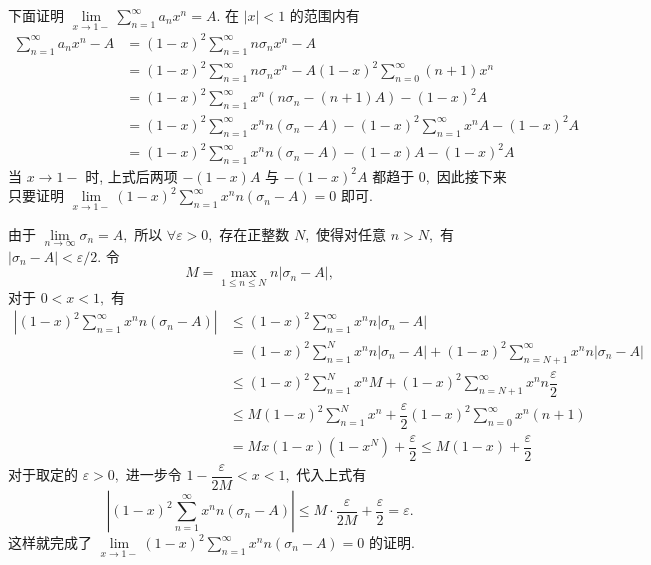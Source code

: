 \begin{solution}
\begin{enumerate}
下面证明 $\lim\limits_{x \to 1-} \sum\limits_{n=1}^{\infty} a_n x^n = A.$ 在 $\lvert x \rvert < 1$ 的范围内有
\begin{align*}
\sum\limits_{n=1}^{\infty} a_n x^n - A & = (1-x)^2 \sum\limits_{n=1}^{\infty} n\sigma_n x^n - A \\
& = (1-x)^2 \sum\limits_{n=1}^{\infty} n\sigma_n x^n - A (1-x)^2 \sum\limits_{n=0}^\infty (n+1) x^n \\
& = (1-x)^2 \sum\limits_{n=1}^\infty x^n (n \sigma_n - (n+1)A) - (1-x)^2 A \\
& = (1-x)^2 \sum\limits_{n=1}^\infty x^n n (\sigma_n - A) - (1-x)^2 \sum\limits_{n=1}^\infty x^n A - (1-x)^2 A \\
& = (1-x)^2 \sum\limits_{n=1}^\infty x^n n (\sigma_n - A) - (1 - x) A - (1-x)^2 A
\end{align*}
当 $x \to 1-$ 时, 上式后两项 $-(1 - x) A$ 与 $-(1-x)^2 A$ 都趋于 $0,$ 因此接下来只要证明 $\lim\limits_{x \to 1-} (1-x)^2 \sum\limits_{n=1}^\infty x^n n (\sigma_n - A) = 0$ 即可.

由于 $\lim\limits_{n\to\infty} \sigma_n = A,$ 所以 $\forall \varepsilon > 0,$ 存在正整数 $N,$ 使得对任意 $n > N,$ 有 $\lvert \sigma_n - A \rvert < \varepsilon / 2.$ 令
$$M = \max\limits_{1\leqslant n \leqslant N} n \lvert \sigma_n - A \rvert,$$
对于 $0 < x < 1,$ 有
\begin{align*}
\left\lvert (1-x)^2 \sum\limits_{n=1}^\infty x^n n (\sigma_n - A) \right\rvert & \leqslant (1-x)^2 \sum\limits_{n=1}^\infty x^n n \lvert \sigma_n - A \rvert \\
& = (1-x)^2 \sum\limits_{n=1}^N x^n n \lvert \sigma_n - A \rvert + (1-x)^2 \sum\limits_{n=N+1}^\infty x^n n \lvert \sigma_n - A \rvert \\
& \leqslant (1-x)^2 \sum\limits_{n=1}^N x^n M + (1-x)^2 \sum\limits_{n=N+1}^\infty x^n n \dfrac{\varepsilon}{2} \\
& \leqslant M (1-x)^2 \sum\limits_{n=1}^N x^n + \dfrac{\varepsilon}{2} (1-x)^2 \sum\limits_{n=0}^\infty x^n (n + 1) \\
& = M x (1 - x) (1 - x^N) + \dfrac{\varepsilon}{2} \leqslant M (1 - x) + \dfrac{\varepsilon}{2}
\end{align*}
对于取定的 $\varepsilon > 0,$ 进一步令 $1 - \dfrac{\varepsilon}{2M} < x < 1,$ 代入上式有
$$\left\lvert (1-x)^2 \sum\limits_{n=1}^\infty x^n n (\sigma_n - A) \right\rvert \leqslant M \cdot \dfrac{\varepsilon}{2M} + \dfrac{\varepsilon}{2} = \varepsilon.$$
这样就完成了 $\lim\limits_{x \to 1-} (1-x)^2 \sum\limits_{n=1}^\infty x^n n (\sigma_n - A) = 0$ 的证明.
\end{enumerate}
\end{solution}


